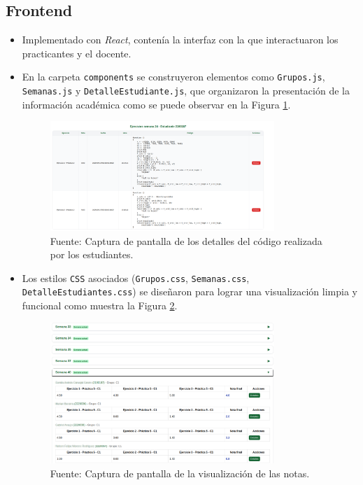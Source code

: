 \documentclass[letter,oneside,12pt,spanish]{report}
\begin{document}
\subsection{Frontend}
\begin{itemize}
    \item Implementado con \textit{React}, contenía la interfaz con la que interactuaron los practicantes y el docente.
    \item En la carpeta \texttt{components} se construyeron elementos como \texttt{Grupos.js}, \texttt{Semanas.js} y \texttt{DetalleEstudiante.js}, que organizaron la presentación de la información académica como se puede observar en la Figura \ref{fig:Detalles}.
    
	\begin{figure}[ht]
		\centering
		\includegraphics[width=0.8\textwidth]{Figs/Detalles_practica.pdf}
		\label{fig:Detalles}
		\\Fuente: Captura de pantalla de los detalles del código realizada por los estudiantes.
	\end{figure}

	\item Los estilos \texttt{CSS} asociados (\texttt{Grupos.css}, \texttt{Semanas.css}, \texttt{DetalleEstudiantes.css}) se diseñaron para lograr una visualización limpia y funcional como muestra la Figura \ref{fig:Interfaz}.
    
	\begin{figure}[ht]
		\centering
		\includegraphics[width=0.8\textwidth]{Figs/Interfaz _de_notas.pdf}
		\label{fig:Interfaz}
		\\Fuente: Captura de pantalla de la visualización de las notas.
	\end{figure}
	

\end{itemize}
\end{document}
